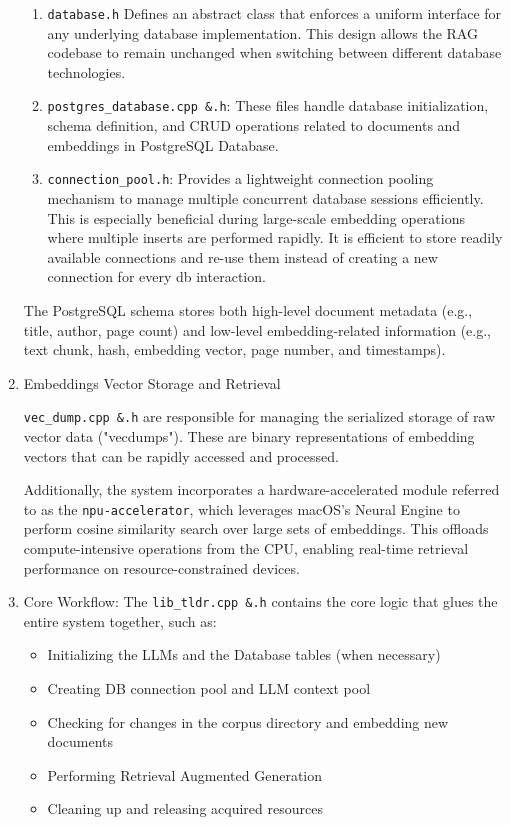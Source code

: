 \begin{enumerate}[label=\Alph*.]
\begin{enumerate}[label=\alph*.]
\item \texttt{database.h}\: Defines an abstract class that enforces a uniform interface for any underlying database implementation. This design allows the RAG codebase to remain unchanged when switching between different database technologies.
    \item \texttt{postgres\_database.cpp \&.h}: These files handle database initialization, schema definition, and CRUD operations related to documents and embeddings in PostgreSQL Database.
    \item \texttt{connection\_pool.h}: Provides a lightweight connection pooling mechanism to manage multiple concurrent database sessions efficiently. This is especially beneficial during large-scale embedding operations where multiple inserts are performed rapidly. It is efficient to store readily available connections and re-use them instead of creating a new connection for every db interaction.
\end{enumerate}

The PostgreSQL schema stores both high-level document metadata (e.g., title, author, page count) and low-level embedding-related information (e.g., text chunk, hash, embedding vector, page number, and timestamps).

\item{Embeddings Vector Storage and Retrieval\:}

\texttt{vec\_dump.cpp \&.h}  are responsible for managing the serialized storage of raw vector data ("vecdumps"). These are binary representations of embedding vectors that can be rapidly accessed and processed.

Additionally, the system incorporates a hardware-accelerated module referred to as the \texttt{npu-accelerator}, which leverages macOS’s Neural Engine to perform cosine similarity search over large sets of embeddings. This offloads compute-intensive operations from the CPU, enabling real-time retrieval performance on resource-constrained devices.

\item{Core Workflow:}
The \texttt{lib\_tldr.cpp \&.h} contains the core logic that glues the entire system together, such as:
\begin{itemize}
    \item Initializing the LLMs and the Database tables (when necessary)
    \item Creating DB connection pool and LLM context pool
    \item Checking for changes in the corpus directory and embedding new documents
    \item Performing Retrieval Augmented Generation
    \item Cleaning up and releasing acquired resources
\end{itemize}



\end{enumerate}
